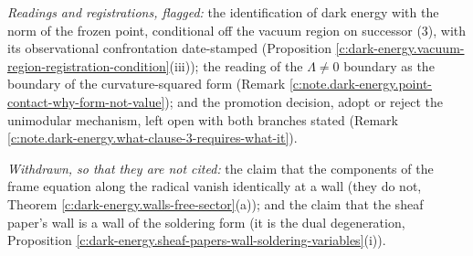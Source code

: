 \documentclass[11pt]{article}
\theoremstyle{definition}
\theoremstyle{plain}
\begin{document}
\emph{Readings and registrations, flagged:} the identification of dark energy with the norm of the frozen point, conditional off the vacuum region on successor (3), with its observational confrontation date-stamped (Proposition \ref{c:dark-energy.vacuum-region-registration-condition}(iii)); the reading of the $\Lambda \neq 0$ boundary as the boundary of the curvature-squared form (Remark \ref{c:note.dark-energy.point-contact-why-form-not-value}); and the promotion decision, adopt or reject the unimodular mechanism, left open with both branches stated (Remark \ref{c:note.dark-energy.what-clause-3-requires-what-it}).

\emph{Withdrawn, so that they are not cited:} the claim that the components of the frame equation along the radical vanish identically at a wall (they do not, Theorem \ref{c:dark-energy.walls-free-sector}(a)); and the claim that the sheaf paper's wall is a wall of the soldering form (it is the dual degeneration, Proposition \ref{c:dark-energy.sheaf-papers-wall-soldering-variables}(i)).
\end{document}
